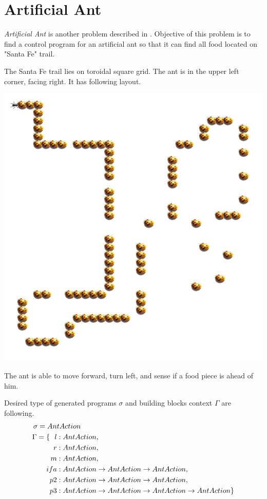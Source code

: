 \documentclass[12pt,a4paper]{report}
\begin{document}



\newpage
\section{Artificial Ant}

\textit{Artificial Ant} is another problem described
in \cite{koza92}. Objective of this problem is to 
find a control program for an artificial ant so
that it can find all food located on "Santa Fe" trail.

The Santa Fe trail lies on toroidal square grid.
The ant is in the upper left corner, facing right.
It has following layout.

\includegraphics[scale=1]{santafe.png}



The ant is able to move forward, turn left, and sense if a food 
piece is ahead of him.

\newpage

Desired type of generated programs $\sigma$ and 
building blocks context $\Gamma$ are following.
\begin{align*}
\sigma = An&tAction\\
\Gamma = \{~~
  l    &: AntAction                              ,\\
  r    &: AntAction                              ,\\
  m    &: AntAction                              ,\\
  ifa  &: AntAction \rightarrow AntAction \rightarrow AntAction  ,\\
  p2   &: AntAction \rightarrow AntAction \rightarrow AntAction  ,\\
  p3   &: AntAction \rightarrow AntAction \rightarrow AntAction \rightarrow AntAction  \}
\end{align*}
\end{document}
